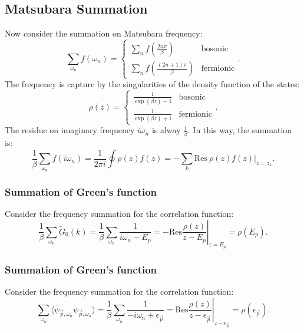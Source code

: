 \subsection{Matsubara Summation}
Now consider the summation on Matsubara frequency:
\begin{equation}
	\sum_{\omega_n} f(\omega_n) = 
	\begin{cases}
		\sum_n f(\frac{2n\pi}{\beta}) & \mathrm{bosonic} \\
		\sum_n f(\frac{(2n+1)\pi}{\beta}) & \mathrm{fermionic}
	\end{cases}.
\end{equation}
The frequency is capture by the singularities of the density function of the states:
\begin{equation}
	\rho(z) = \begin{cases}
		\frac{1}{\exp(\beta z)-1} & \mathrm{bosonic} \\
		\frac{1}{\exp(\beta z)+1} & \mathrm{fermionic}
	\end{cases}.
\end{equation}
The residue on imaginary frequency $i\omega_n$ is alway $\frac{1}{\beta}$. In this way, the summation is:
\begin{equation}
	\frac{1}{\beta}\sum_{\omega_n} f(i\omega_n) 
	= \frac{1}{2\pi i} \oint \rho(z)f(z)
	= -\sum_{k} \mathrm{Res}\ \rho(z)f(z)|_{z=z_k}.
\end{equation}

\subsubsection*{Summation of Green's function}
Consider the frequency summation for the correlation function:
\begin{equation}
	\frac{1}{\beta}\sum_{\omega_n} \tilde{G}_0(k) 
	= \frac{1}{\beta}\sum_{\omega_n}\frac{1}{i\omega_n-E_{p}}
	= -\mathrm{Res} \left. \frac{\rho(z)}{z-E_{p}}\right|_{z=E_{p}}
	= \rho(E_{p}).
\end{equation}


\subsubsection*{Summation of Green's function}
Consider the frequency summation for the correlation function:
\begin{equation}
	\sum_{\omega_n} \langle\bar\psi_{\vec p,\omega_n}\psi_{\vec p, \omega_n}\rangle = \frac{1}{\beta}\sum_{\omega_n}\frac{1}{-i\omega_n+\epsilon_{\vec p}}
	= \mathrm{Res} \left. \frac{\rho(z)}{z-\epsilon_{\vec p}}\right|_{z-\epsilon_{\vec p}}
	= \rho(\epsilon_{\vec p}).
\end{equation}

